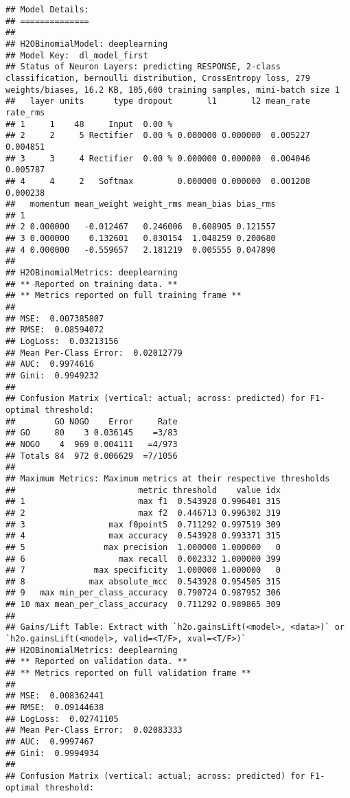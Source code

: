 \documentclass[]{article}
\begin{document}
\begin{verbatim}
## Model Details:
## ==============
## 
## H2OBinomialModel: deeplearning
## Model Key:  dl_model_first 
## Status of Neuron Layers: predicting RESPONSE, 2-class classification, bernoulli distribution, CrossEntropy loss, 279 weights/biases, 16.2 KB, 105,600 training samples, mini-batch size 1
##   layer units      type dropout       l1       l2 mean_rate rate_rms
## 1     1    48     Input  0.00 %                                     
## 2     2     5 Rectifier  0.00 % 0.000000 0.000000  0.005227 0.004851
## 3     3     4 Rectifier  0.00 % 0.000000 0.000000  0.004046 0.005787
## 4     4     2   Softmax         0.000000 0.000000  0.001208 0.000238
##   momentum mean_weight weight_rms mean_bias bias_rms
## 1                                                   
## 2 0.000000   -0.012467   0.246006  0.608905 0.121557
## 3 0.000000    0.132601   0.830154  1.048259 0.200680
## 4 0.000000   -0.559657   2.181219  0.005555 0.047890
## 
## H2OBinomialMetrics: deeplearning
## ** Reported on training data. **
## ** Metrics reported on full training frame **
## 
## MSE:  0.007385807
## RMSE:  0.08594072
## LogLoss:  0.03213156
## Mean Per-Class Error:  0.02012779
## AUC:  0.9974616
## Gini:  0.9949232
## 
## Confusion Matrix (vertical: actual; across: predicted) for F1-optimal threshold:
##        GO NOGO    Error     Rate
## GO     80    3 0.036145    =3/83
## NOGO    4  969 0.004111   =4/973
## Totals 84  972 0.006629  =7/1056
## 
## Maximum Metrics: Maximum metrics at their respective thresholds
##                         metric threshold    value idx
## 1                       max f1  0.543928 0.996401 315
## 2                       max f2  0.446713 0.996302 319
## 3                 max f0point5  0.711292 0.997519 309
## 4                 max accuracy  0.543928 0.993371 315
## 5                max precision  1.000000 1.000000   0
## 6                   max recall  0.002332 1.000000 399
## 7              max specificity  1.000000 1.000000   0
## 8             max absolute_mcc  0.543928 0.954505 315
## 9   max min_per_class_accuracy  0.790724 0.987952 306
## 10 max mean_per_class_accuracy  0.711292 0.989865 309
## 
## Gains/Lift Table: Extract with `h2o.gainsLift(<model>, <data>)` or `h2o.gainsLift(<model>, valid=<T/F>, xval=<T/F>)`
## H2OBinomialMetrics: deeplearning
## ** Reported on validation data. **
## ** Metrics reported on full validation frame **
## 
## MSE:  0.008362441
## RMSE:  0.09144638
## LogLoss:  0.02741105
## Mean Per-Class Error:  0.02083333
## AUC:  0.9997467
## Gini:  0.9994934
## 
## Confusion Matrix (vertical: actual; across: predicted) for F1-optimal threshold:

\end{verbatim}
\end{document}

